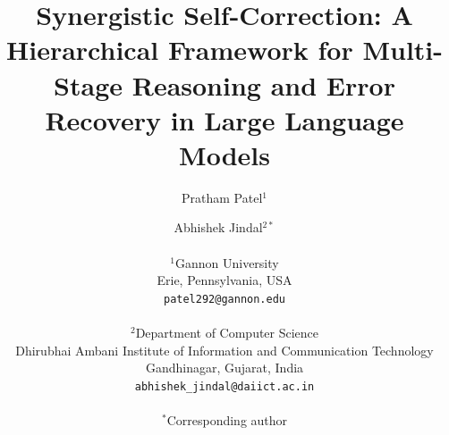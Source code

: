 \documentclass[10pt,twocolumn]{article}
\begin{document}
\title{Synergistic Self-Correction: A Hierarchical Framework for Multi-Stage Reasoning and Error Recovery in Large Language Models}

\author{
  Pratham Patel$^{1}$ \and
  Abhishek Jindal$^{2*}$ \\
  \\
  $^1$Gannon University \\
  Erie, Pennsylvania, USA \\
  \texttt{patel292@gannon.edu} \\
  \\
  $^2$Department of Computer Science \\
  Dhirubhai Ambani Institute of Information and Communication Technology \\
  Gandhinagar, Gujarat, India \\
  \texttt{abhishek\_jindal@daiict.ac.in} \\
  \\
  $^*$Corresponding author
}

\maketitle
\end{document}
